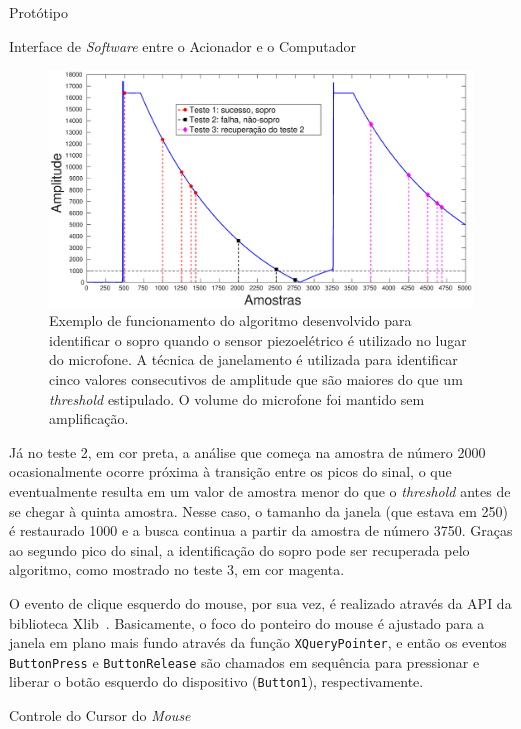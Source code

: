 \begin{chapter}{Protótipo}
\begin{section}{Interface de \textit{Software} entre o Acionador e o Computador}
\begin{figure}
	\centering
	\includegraphics[width=1.00\linewidth]{fig/pa_thresh}
	\caption{Exemplo de funcionamento do algoritmo desenvolvido para identificar
	o sopro quando o sensor piezoelétrico é utilizado no lugar do microfone. A
	técnica de janelamento é utilizada para identificar cinco valores
	consecutivos de amplitude que são maiores do que um \textit{threshold}
	estipulado. O volume do microfone foi mantido sem amplificação.}
	\label{fig:pa_thresh}
\end{figure}

Já no teste 2, em cor preta, a análise que começa na amostra de número 2000
ocasionalmente ocorre próxima à transição entre os picos do sinal, o que
eventualmente resulta em um valor de amostra menor do que o \textit{threshold}
antes de se chegar à quinta amostra. Nesse caso, o tamanho da janela (que estava
em 250) é restaurado 1000 e a busca continua a partir da amostra de número 3750.
Graças ao segundo pico do sinal, a identificação do sopro pode ser recuperada
pelo algoritmo, como mostrado no teste 3, em cor magenta. 

O evento de clique esquerdo do mouse, por sua vez, é realizado através da API da
biblioteca Xlib~\cite{xlib}. Basicamente, o foco do ponteiro do mouse é ajustado
para a janela em plano mais fundo através da função \texttt{XQueryPointer}, e
então os eventos \texttt{ButtonPress} e \texttt{ButtonRelease} são chamados em
sequência para pressionar e liberar o botão esquerdo do dispositivo
(\texttt{Button1}), respectivamente.
\end{section}

\begin{section}{Controle do Cursor do \textit{Mouse}}


\end{section}
\end{chapter}
